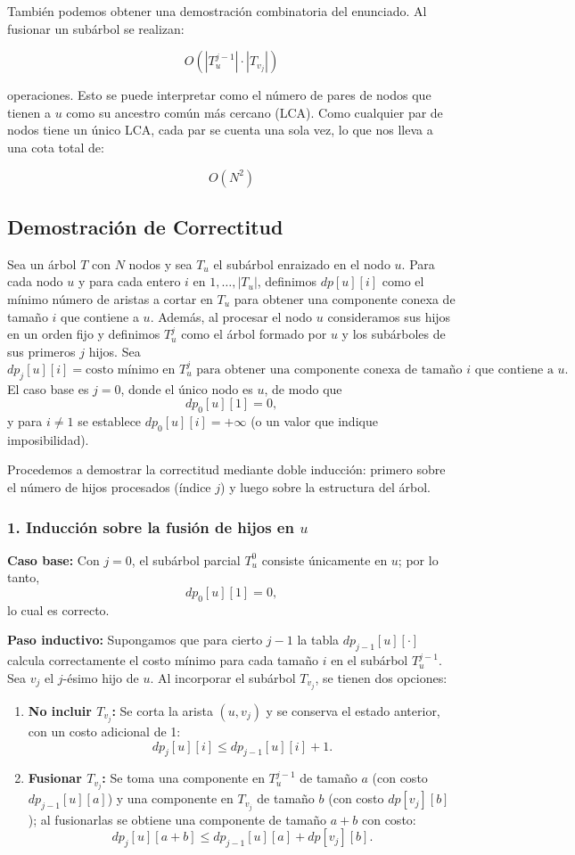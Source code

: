 \documentclass[a4paper, 12pt]{article}
\begin{document}
También podemos obtener una demostración combinatoria del enunciado. Al fusionar un subárbol se realizan:

\[
O(|T_u^{j-1}| \cdot |T_{v_j}|)
\]

operaciones. Esto se puede interpretar como el número de pares de nodos que tienen a $u$ como su ancestro común más cercano (LCA).
Como cualquier par de nodos tiene un único LCA, cada par se cuenta una sola vez, lo que nos lleva a una cota total de:

\[
O(N^2)
\]

\subsection{Demostración de Correctitud}

Sea un árbol \(T\) con \(N\) nodos y sea \(T_u\) el subárbol enraizado en el nodo \(u\). Para cada nodo \(u\) y para cada entero \(i\) en \(1,\dots,|T_u|\), definimos $dp[u][i]$ como el mínimo número de aristas a cortar en  $T_u$ para obtener una componente conexa de tamaño $i$ que contiene a  $u$.
Además, al procesar el nodo \(u\) consideramos sus hijos en un orden fijo y definimos \(T_u^j\) como el árbol formado por \(u\) y los subárboles de sus primeros \(j\) hijos. Sea
\[
dp_j[u][i] = \text{costo mínimo en } T_u^j \text{ para obtener una componente conexa de tamaño } i \text{ que contiene a } u.
\]
El caso base es \(j=0\), donde el único nodo es \(u\), de modo que
\[
dp_0[u][1] = 0,
\]
y para \(i \neq 1\) se establece \(dp_0[u][i] = +\infty\) (o un valor que indique imposibilidad).

Procedemos a demostrar la correctitud mediante doble inducción: primero sobre el número de hijos procesados (índice \(j\)) y luego sobre la estructura del árbol.

\subsubsection*{1. Inducción sobre la fusión de hijos en \(u\)}

\textbf{Caso base:} Con \(j=0\), el subárbol parcial \(T_u^0\) consiste únicamente en \(u\); por lo tanto,
\[
dp_0[u][1] = 0,
\]
lo cual es correcto.

\textbf{Paso inductivo:}  
Supongamos que para cierto \(j-1\) la tabla \(dp_{j-1}[u][\cdot]\) calcula correctamente el costo mínimo para cada tamaño \(i\) en el subárbol \(T_u^{j-1}\). Sea \(v_j\) el \(j\)-ésimo hijo de \(u\). Al incorporar el subárbol \(T_{v_j}\), se tienen dos opciones:
\begin{enumerate}
    \item \textbf{No incluir \(T_{v_j}\):}  
    Se corta la arista \((u,v_j)\) y se conserva el estado anterior, con un costo adicional de 1:
    \[
    dp_j[u][i] \le dp_{j-1}[u][i] + 1.
    \]
    \item \textbf{Fusionar \(T_{v_j}\):}  
    Se toma una componente en \(T_u^{j-1}\) de tamaño \(a\) (con costo \(dp_{j-1}[u][a]\)) y una componente en \(T_{v_j}\) de tamaño \(b\) (con costo \(dp[v_j][b]\)); al fusionarlas se obtiene una componente de tamaño \(a+b\) con costo:
    \[
    dp_j[u][a+b] \le dp_{j-1}[u][a] + dp[v_j][b].
    \]
\end{enumerate}
\end{document}
